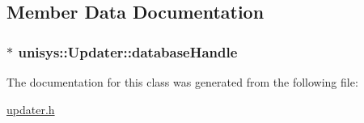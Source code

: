 \subsection{Member Data Documentation}
\hypertarget{classunisys_1_1Updater_a9fd851b4b2c640c9ce6adf73aa3570cc}{
\subsubsection[{database\-Handle}]{$\ast$ unisys\-::\-Updater\-::database\-Handle\hspace{0.3cm}{\ttfamily [protected]}}}\label{classunisys_1_1Updater_a9fd851b4b2c640c9ce6adf73aa3570cc}


The documentation for this class was generated from the following file\-:\begin{DoxyCompactItemize}
\item 
\hyperlink{updater_8h}{updater.\-h}\end{DoxyCompactItemize}
